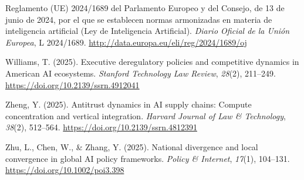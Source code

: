 \begin{list}{}{\setlength{\leftmargin}{1.5em}\setlength{\itemindent}{-1.5em}\setlength{\itemsep}{0.35ex}\setlength{\parsep}{0pt}}
\item Reglamento (UE) 2024/1689 del Parlamento Europeo y del Consejo, de 13 de junio de 2024, por el que se establecen normas armonizadas en materia de inteligencia artificial (Ley de Inteligencia Artificial). \textit{Diario Oficial de la Unión Europea}, L 2024/1689. \url{http://data.europa.eu/eli/reg/2024/1689/oj}

\item Williams, T. (2025). Executive deregulatory policies and competitive dynamics in American AI ecosystems. \textit{Stanford Technology Law Review}, \textit{28}(2), 211--249. \url{https://doi.org/10.2139/ssrn.4912041}

\item Zheng, Y. (2025). Antitrust dynamics in AI supply chains: Compute concentration and vertical integration. \textit{Harvard Journal of Law \& Technology}, \textit{38}(2), 512--564. \url{https://doi.org/10.2139/ssrn.4812391}

\item Zhu, L., Chen, W., \& Zhang, Y. (2025). National divergence and local convergence in global AI policy frameworks. \textit{Policy \& Internet}, \textit{17}(1), 104--131. \url{https://doi.org/10.1002/poi3.398}
\end{list}
